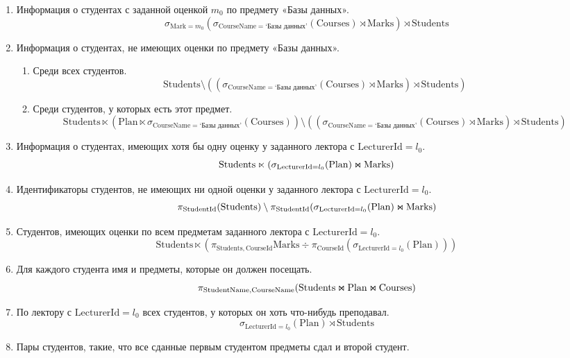 \documentclass{article}
\newcommand{\Students}{\mathrm{Students}}
\newcommand{\StudentId}{\mathrm{StudentId}}
\newcommand{\StudentName}{\mathrm{StudentName}}
\newcommand{\Courses}{\mathrm{Courses}}
\newcommand{\CourseId}{\mathrm{CourseId}}
\newcommand{\CourseName}{\mathrm{CourseName}}
\newcommand{\Plan}{\mathrm{Plan}}
\newcommand{\LecturerId}{\mathrm{LecturerId}}
\newcommand{\Marks}{\mathrm{Marks}}
\newcommand{\Mark}{\mathrm{Mark}}
\newcommand{\join}{\mathbin{\mathrlap{\ltimes}{\rtimes}}}
\begin{document}
\begin{enumerate}
    \item Информация о студентах с заданной оценкой $m_0$ по предмету «Базы данных».
    \[
        \sigma_{\Mark = m_0}
        (\sigma_{\CourseName = \text{`Базы данных'}}(\Courses)
        \rtimes \Marks)
        \rtimes \Students
    \]
    \item Информация о студентах, не имеющих оценки по предмету «Базы данных».
    \begin{enumerate}
        \item Среди всех студентов.
        \[
            \Students \setminus (
            (\sigma_{\CourseName = \text{`Базы данных'}}(\Courses)
            \rtimes \Marks)
            \rtimes \Students)
        \]
        \item Среди студентов, у которых есть этот предмет.
        \[
            \Students \ltimes (
            \Plan \ltimes
            \sigma_{\CourseName = \text{`Базы данных'}}(\Courses))
            \setminus (
            (\sigma_{\CourseName = \text{`Базы данных'}}(\Courses)
            \rtimes \Marks)
            \rtimes \Students)
        \]
    \end{enumerate}
    \item Информация о студентах, имеющих хотя бы одну оценку у заданного
        лектора с $\LecturerId=l_0$.
    \[
        \Students \ltimes (\sigma_{\LecturerId = l_0}(\Plan) \join \Marks)
    \]
    \item Идентификаторы студентов, не имеющих ни одной оценки у заданного
        лектора с $\LecturerId=l_0$.
    \[
        \pi_{\StudentId}(\Students)\setminus
        \pi_{\StudentId}(\sigma_{\LecturerId = l_0}(\Plan) \join \Marks)
    \]
    \item Студентов, имеющих оценки по всем предметам заданного
        лектора с $\LecturerId=l_0$.
    \[
        \Students \ltimes (
        \pi_{\Students, \CourseId}\Marks \div
        \pi_{\CourseId}(\sigma_{\LecturerId=l_0}(\Plan)))
    \]
    \item Для каждого студента имя и предметы, которые он должен посещать.
    \[
        \pi_{\StudentName, \CourseName}(\Students \join \Plan \join \Courses)
    \]
    \item По лектору с $\LecturerId=l_0$ всех студентов,
        у которых он хоть что-нибудь преподавал.
    \[
        \sigma_{\LecturerId=l_0}(\Plan) \rtimes \Students
    \]
    \item Пары студентов, такие, что все сданные первым студентом предметы сдал и второй студент.

\end{enumerate}
\end{document}
